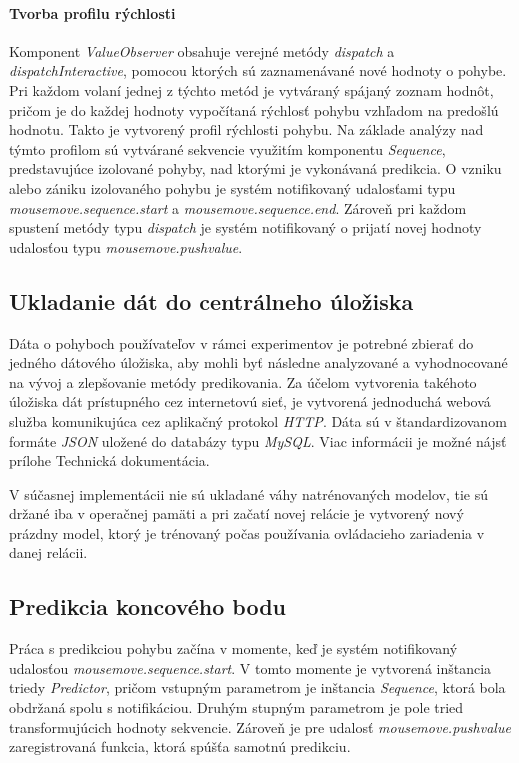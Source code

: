 \paragraph{Tvorba profilu rýchlosti}
Komponent \emph{ValueObserver} obsahuje verejné metódy \emph{dispatch} a \emph{dispatchInteractive}, pomocou ktorých sú zaznamenávané nové hodnoty o pohybe. Pri každom volaní jednej z týchto metód je vytváraný spájaný zoznam hodnôt, pričom je do každej hodnoty vypočítaná rýchlosť pohybu vzhľadom na predošlú hodnotu. Takto je vytvorený profil rýchlosti pohybu. Na základe analýzy nad týmto profilom sú vytvárané sekvencie využitím komponentu \emph{Sequence}, predstavujúce izolované pohyby, nad ktorými je vykonávaná predikcia. O vzniku alebo zániku izolovaného pohybu je systém notifikovaný udalosťami typu \emph{mousemove.sequence.start} a \emph{mousemove.sequence.end}. Zároveň pri každom spustení metódy typu \emph{dispatch} je systém notifikovaný o prijatí novej hodnoty udalosťou typu \emph{mousemove.pushvalue}.

\subsection{Ukladanie dát do centrálneho úložiska}
Dáta o pohyboch používateľov v rámci experimentov je potrebné zbierať do jedného dátového úložiska, aby mohli byť následne analyzované a vyhodnocované na vývoj a zlepšovanie metódy predikovania. Za účelom vytvorenia takéhoto úložiska dát prístupného cez internetovú sieť, je vytvorená jednoduchá webová služba komunikujúca cez aplikačný protokol \emph{HTTP}. Dáta sú v štandardizovanom formáte \emph{JSON} uložené do databázy typu \emph{MySQL}. Viac informácii je možné nájsť prílohe Technická dokumentácia.

V súčasnej implementácii nie sú ukladané váhy natrénovaných modelov, tie sú držané iba v operačnej pamäti a pri začatí novej relácie je vytvorený nový prázdny model, ktorý je trénovaný počas používania ovládacieho zariadenia v danej relácii.

\subsection{Predikcia koncového bodu}
Práca s predikciou pohybu začína v momente, keď je systém notifikovaný udalosťou \emph{mousemove.sequence.start}. V tomto momente je vytvorená inštancia triedy \emph{Predictor}, pričom vstupným parametrom je inštancia \emph{Sequence}, ktorá bola obdržaná spolu s notifikáciou. Druhým stupným parametrom je pole tried transformujúcich hodnoty sekvencie. Zároveň je pre udalosť \emph{mousemove.pushvalue} zaregistrovaná funkcia, ktorá spúšťa samotnú predikciu.

